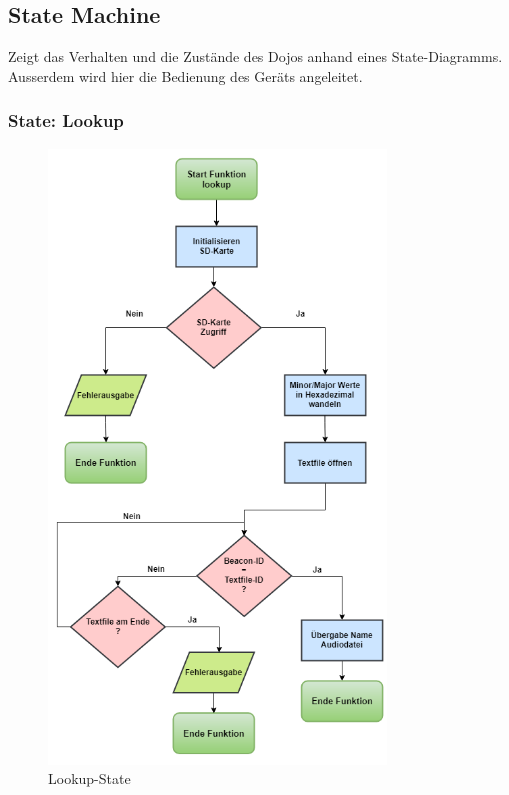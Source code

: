 \subsection{State Machine}\label{sec:stateMachine}

Zeigt das Verhalten und die Zustände des Dojos anhand eines State-Diagramms. Ausserdem wird hier die Bedienung des Geräts angeleitet.

\subsubsection*{State: Lookup}

\begin{figure}[htbp]
	\centering
	\includegraphics[width=0.8\textwidth]{Data/lookup_picture}
	\caption[Statemachine: lookup]{Lookup-State}
	\label{fig:lookupState}
\end{figure} 